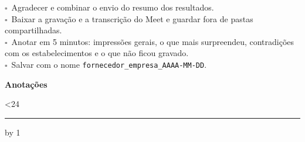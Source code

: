 \documentclass[11pt,a4paper]{article}
\newcommand{\caixa}{$\square$\ }
\begin{document}
\begin{tcolorbox}[colback=gray!6,colframe=gray!50,title=Logo depois da entrevista,fonttitle=\bfseries]
\caixa Agradecer e combinar o envio do resumo dos resultados.\\
\caixa Baixar a gravação e a transcrição do Meet e guardar fora de pastas compartilhadas.\\
\caixa Anotar em 5 minutos: impressões gerais, o que mais surpreendeu, contradições com os estabelecimentos e o que não ficou gravado.\\
\caixa Salvar com o nome \texttt{fornecedor\_empresa\_AAAA-MM-DD}.
\end{tcolorbox}

\newpage
\textbf{Anotações}\par
\vspace{0.5em}
\newcount\linhas {}
\loop\ifnum\linhas<24 \rule{\linewidth}{0.3pt}\par\vspace{0.7em}\advance\linhas by 1 \repeat
\end{document}
